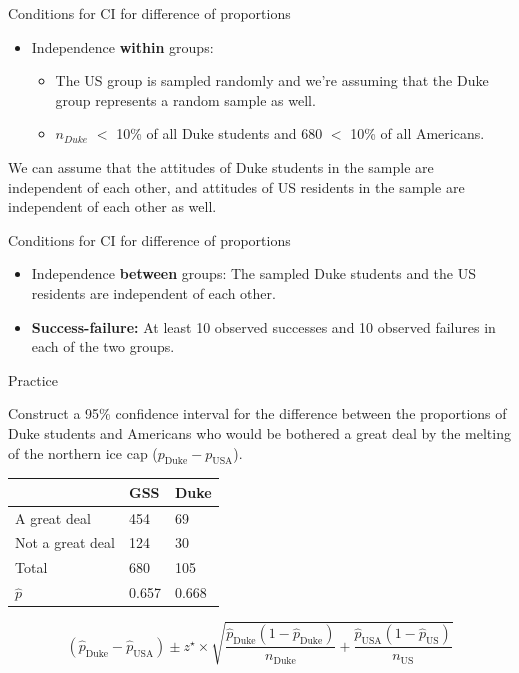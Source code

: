 \documentclass[
  ignorenonframetext,
]{beamer}
\providecommand{\tightlist}{%
  \setlength{\itemsep}{0pt}\setlength{\parskip}{0pt}}
\begin{document}
\begin{frame}{Conditions for CI for difference of proportions}
\protect\hypertarget{conditions-for-ci-for-difference-of-proportions}{}

\begin{itemize}
\tightlist
\item
  Independence \textbf{within} groups:

  \begin{itemize}
  \tightlist
  \item
    The US group is sampled randomly and we're assuming that the Duke
    group represents a random sample as well.
  \item
    \(n_{Duke}\) \(<\) 10\% of all Duke students and 680 \(<\) 10\% of
    all Americans.
  \end{itemize}
\end{itemize}

We can assume that the attitudes of Duke students in the sample are
independent of each other, and attitudes of US residents in the sample
are independent of each other as well.

\end{frame}

\begin{frame}{Conditions for CI for difference of proportions}
\protect\hypertarget{conditions-for-ci-for-difference-of-proportions-1}{}

\begin{itemize}
\tightlist
\item
  Independence \textbf{between} groups: The sampled Duke students and
  the US residents are independent of each other.
\item
  \textbf{Success-failure:} At least 10 observed successes and 10
  observed failures in each of the two groups.
\end{itemize}

\end{frame}

\begin{frame}{Practice}
\protect\hypertarget{practice}{}

Construct a 95\% confidence interval for the difference between the
proportions of Duke students and Americans who would be bothered a great
deal by the melting of the northern ice cap
(\(p_\text{Duke} - p_\text{USA}\)).

\begin{longtable}[]{@{}lll@{}}
\toprule
\(\;\) & GSS & Duke\tabularnewline
\midrule
\endhead
A great deal & 454 & 69\tabularnewline
Not a great deal & 124 & 30\tabularnewline
Total & 680 & 105\tabularnewline
\(\hat{p}\) & 0.657 & 0.668\tabularnewline
\bottomrule
\end{longtable}

\[
(\hat{p}_\text{Duke} - \hat{p}_\text{USA}) \pm z^\star \times \sqrt{ \frac{ \hat{p}_\text{Duke} (1 - \hat{p}_\text{Duke})}{n_\text{Duke} } + \frac{ \hat{p}_\text{USA} (1 -  \hat{p}_\text{US})}{n_\text{US} } } 
\]

\end{frame}
\end{document}
